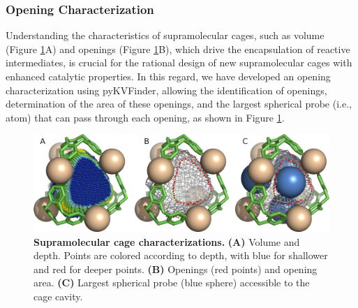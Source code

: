 \documentclass[Ingles]{phdthesis}
\def\ie{i.e.\onedot}
\begin{document}
\subsubsection{Opening Characterization \label{sec:opening-characterization}}

Understanding the characteristics of supramolecular cages, such as volume (Figure \ref{fig:cage-characterization}A) and openings (Figure \ref{fig:cage-characterization}B), which drive the encapsulation of reactive intermediates, is crucial for the rational design of new supramolecular cages with enhanced catalytic properties. In this regard, we have developed an opening characterization using pyKVFinder, allowing the identification of openings, determination of the area of these openings, and the largest spherical probe (\ie, atom) that can pass through each opening, as shown in Figure \ref{fig:cage-characterization}.

\begin{figure}[ht]
  \centering
  \includegraphics[scale=1.2]{images/cage-characterization.png}
  \caption[Supramolecular cage characterizations]{\textbf{Supramolecular cage characterizations.} \textbf{(A)} Volume and depth. Points are colored according to depth, with blue for shallower and red for deeper points. \textbf{(B)} Openings (red points) and opening area. \textbf{(C)} Largest spherical probe (blue sphere) accessible to the cage cavity.}
  \label{fig:cage-characterization}
\end{figure}
\end{document}
